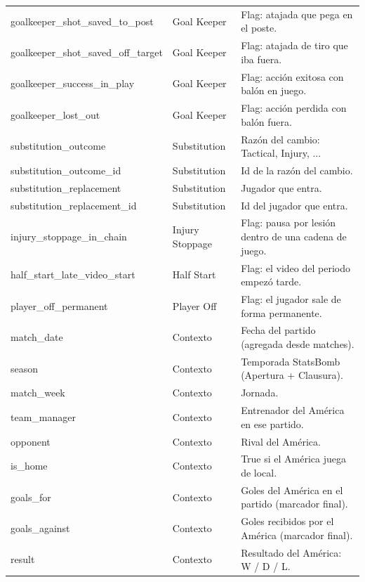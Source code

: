 {\begin{longtable}{p{4.3cm}p{2.2cm}p{8.8cm}}
goalkeeper\_shot\_saved\_to\_post & Goal Keeper & Flag: atajada que pega en el poste. \\
goalkeeper\_shot\_saved\_off\_target & Goal Keeper & Flag: atajada de tiro que iba fuera. \\
goalkeeper\_success\_in\_play & Goal Keeper & Flag: acción exitosa con balón en juego. \\
goalkeeper\_lost\_out & Goal Keeper & Flag: acción perdida con balón fuera. \\
substitution\_outcome & Substitution & Razón del cambio: Tactical, Injury, ... \\
substitution\_outcome\_id & Substitution & Id de la razón del cambio. \\
substitution\_replacement & Substitution & Jugador que entra. \\
substitution\_replacement\_id & Substitution & Id del jugador que entra. \\
injury\_stoppage\_in\_chain & Injury Stoppage & Flag: pausa por lesión dentro de una cadena de juego. \\
half\_start\_late\_video\_start & Half Start & Flag: el video del periodo empezó tarde. \\
player\_off\_permanent & Player Off & Flag: el jugador sale de forma permanente. \\
match\_date & Contexto & Fecha del partido (agregada desde matches). \\
season & Contexto & Temporada StatsBomb (Apertura + Clausura). \\
match\_week & Contexto & Jornada. \\
team\_manager & Contexto & Entrenador del América en ese partido. \\
opponent & Contexto & Rival del América. \\
is\_home & Contexto & True si el América juega de local. \\
goals\_for & Contexto & Goles del América en el partido (marcador final). \\
goals\_against & Contexto & Goles recibidos por el América (marcador final). \\
result & Contexto & Resultado del América: W / D / L. \\
\end{longtable}
}